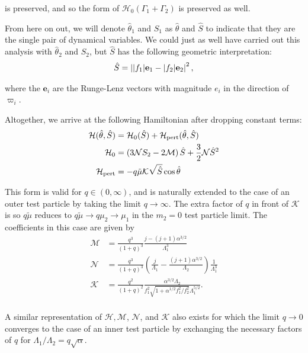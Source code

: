 \documentclass[usenatbib]{mnras}
\DeclarePairedDelimiter{\abs}{|}{|}
\begin{document}
\noindent
is preserved, and so the form of \(\mathcal H_0(\Gamma_1+\Gamma_2)\)
is preserved as well.

From here on out, we will denote \(\hat\theta_1\) and \(S_1\) as
\(\hat\theta\) and \(\hat S\) to indicate that they are the single pair of
dynamical variables.  We could just as well have carried out this
analysis with \(\hat\theta_2\) and \(S_2\), but \(\hat S\) has the following
geometric interpretation:
\begin{align}
  \hat S = \left\lvert \abs{f_1}\mathbf{e}_1 - \abs{f_2}\mathbf{e}_2\right\rvert^2,
\end{align}

\noindent
where the \(\mathbf{e}_i\) are the Runge-Lenz vectors with magnitude
\(e_i\) in the direction of \(\varpi_i\).  

Altogether, we arrive at the following Hamiltonian after
dropping constant terms:
\begin{align}
  \label{eq:HShat}\mathcal H(\hat \theta, \hat S) &= \mathcal H_0(\hat S) + \mathcal H_{\rm pert}(\hat \theta, \hat S) \\
  \mathcal H_0
  &= \left( 3\mathcal NS_2 -2\mathcal M\right) \hat S
    + \frac32 \mathcal N \hat S^2 \\
  \mathcal H_{\rm pert}
  &= - q\tilde\mu\mathcal K\sqrt{\hat S}\cos\hat\theta
\end{align}

\noindent This form is valid for \(q\in (0,\infty)\), and is
naturally extended to the case of an outer test particle by taking the
limit \(q\to\infty\).  The extra factor of \(q\) in front of \(\mathcal K\)
is so \(q\tilde\mu\) reduces to \(q\tilde\mu\to q\mu_2 \to \mu_1\) in the
\(m_2=0\) test particle limit.  The coefficients in this case are given
by
\begin{align}
  \mathcal M
  &= \frac{q^3}{(1+q)^3}\frac{j-(j+1)\alpha^{3/2}}{\Lambda_1^3}\\
  \mathcal N
  &= \frac{q^3}{(1+q)^3}\left(
    \frac{j}{\Lambda_1} - \frac{(j+1)\alpha^{3/2}}{\Lambda_2}
    \right)\frac{1}{\Lambda_1^3}\\
  \mathcal K
  &= \frac{q^2}{(1+q)^2}
    \frac{\alpha^{3/2}\Lambda_2}{f_1^2\sqrt{1+\alpha^{1/2}f_1^2/f_2^2}\Lambda_1^{5/2}}.\\
\end{align}

A similar representation of \(\mathcal H, \mathcal M\), \(\mathcal N\),
and \(\mathcal{K}\) also exists for which the limit \(q\to 0\) converges
to the case of an inner test particle by exchanging the necessary
factors of \(q\) for \(\Lambda_1/\Lambda_2 = q\sqrt\alpha\).
\end{document}

